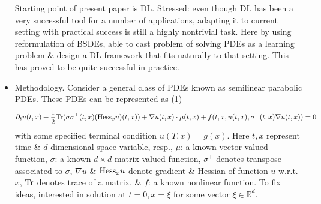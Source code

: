 \documentclass{article}
\begin{document}
\begin{itemize}
	Starting point of present paper is DL. Stressed: even though DL has been a very successful tool for a number of applications, adapting it to current setting with practical success is still a highly nontrivial task. Here by using reformulation of BSDEs, able to cast problem of solving PDEs as a learning problem \& design a DL framework that fits naturally to that setting. This has proved to be quite successful in practice.
	\item {\sf Methodology.} Consider a general class of PDEs known as semilinear parabolic PDEs. These PDEs can be represented as (1)
	\begin{equation*}
		\partial_tu(t,x) + \frac{1}{2}{\rm Tr}(\sigma\sigma^\top(t,x)({\rm Hess}_xu)(t,x)) + \nabla u(t,x)\cdot\mu(t,x) + f(t,x,u(t,x),\sigma^\top(t,x)\nabla u(t,x)) = 0
	\end{equation*}
	with some specified terminal condition $u(T,x) = g(x)$. Here $t,x$ represent time \& $d$-dimensional space variable, resp., $\mu$: a known vector-valued function, $\sigma$: a known $d\times d$ matrix-valued function, $\sigma^\top$ denotes transpose associated to $\sigma$, $\nabla u$ \& ${\rm Hess}_xu$ denote gradient \& Hessian of function $u$ w.r.t. $x$, ${\rm Tr}$ denotes trace of a matrix, \& $f$: a known nonlinear function. To fix ideas, interested in solution at $t = 0,x = \xi$ for some vector $\xi\in\mathbb{R}^d$.


\end{itemize}
\end{document}
